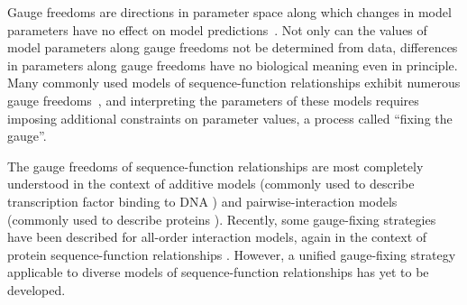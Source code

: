 \documentclass[10pt,letterpaper]{article}
\begin{document}
Gauge freedoms are directions in parameter space along which changes in model parameters have no effect on model predictions~\cite{jackson2001historical}. Not only can the values of model parameters along gauge freedoms not be determined from data, differences in parameters along gauge freedoms have no biological meaning even in principle. Many commonly used models of sequence-function relationships exhibit numerous gauge freedoms~\cite{Kinney:2007dh, Weigt:2009th, Marks:2011aa, Stormo:2011jb, Ekeberg:2013bb, Ekeberg:2014aa, Stein:2015br, Barton:2016aa, Haldane:2018df, Cocco:2018aa, Haldane:2019di, Zamuner:2021gy, Feinauer:2022aa, Gerardos:2022aa, Hsu:2022ek, Feinauer:2022bb, Rube:2022ye}, and interpreting the parameters of these models requires imposing additional constraints on parameter values, a process called ``fixing the gauge''. 

The gauge freedoms of sequence-function relationships are most completely understood in the context of additive models (commonly used to describe transcription factor binding to DNA \cite{Kinney:2007dh, Stormo:2011jb, Rube:2022ye}) and pairwise-interaction models (commonly used to describe proteins \cite{Weigt:2009th, Marks:2011aa, Ekeberg:2013bb, Ekeberg:2014aa, Stein:2015br, Barton:2016aa, Haldane:2018df, Cocco:2018aa, Haldane:2019di, Zamuner:2021gy, Feinauer:2022aa, Gerardos:2022aa, Hsu:2022ek, Feinauer:2022bb}). Recently, some gauge-fixing strategies have been described for all-order interaction models, again in the context of protein sequence-function relationships \cite{Zamuner:2021gy, Feinauer:2022aa, Feinauer:2022bb}. However, a unified gauge-fixing strategy applicable to diverse models of sequence-function relationships has yet to be developed. 
\end{document}
